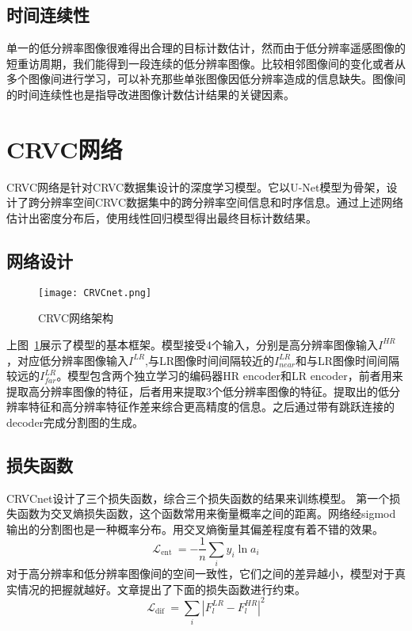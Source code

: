 \subsection{时间连续性}
单一的低分辨率图像很难得出合理的目标计数估计，然而由于低分辨率遥感图像的短重访周期，我们能得到一段连续的低分辨率图像。比较相邻图像间的变化或者从多个图像间进行学习，可以补充那些单张图像因低分辨率造成的信息缺失。图像间的时间连续性也是指导改进图像计数估计结果的关键因素。
\section{CRVC网络}
CRVC网络是针对CRVC数据集设计的深度学习模型。它以U-Net模型为骨架，设计了跨分辨率空间CRVC数据集中的跨分辨率空间信息和时序信息。通过上述网络估计出密度分布后，使用线性回归模型得出最终目标计数结果。
\subsection{网络设计}
\begin{figure}[h]
    \centering
    \texttt{[image: CRVCnet.png]}
    \caption{CRVC网络架构}
    \label{fig:CRVCnet}
\end{figure}

上图~\ref{fig:CRVCnet}展示了模型的基本框架。模型接受4个输入，分别是高分辨率图像输入$I^{HR}$，对应低分辨率图像输入$I^{LR}$,与LR图像时间间隔较近的$I^{LR}_{near}$和与LR图像时间间隔较远的$I^{LR}_{far}$。模型包含两个独立学习的编码器HR encoder和LR encoder，前者用来提取高分辨率图像的特征，后者用来提取3个低分辨率图像的特征。提取出的低分辨率特征和高分辨率特征作差来综合更高精度的信息。之后通过带有跳跃连接的decoder完成分割图的生成。
\subsection{损失函数}
CRVCnet设计了三个损失函数，综合三个损失函数的结果来训练模型。
第一个损失函数为交叉熵损失函数，这个函数常用来衡量概率之间的距离。网络经sigmod输出的分割图也是一种概率分布。用交叉熵衡量其偏差程度有着不错的效果。
\begin{equation}
    \mathcal{L}_{\text {ent }}=-\frac{1}{n} \sum_{i} y_{i} \ln a_{i}
\end{equation}
对于高分辨率和低分辨率图像间的空间一致性，它们之间的差异越小，模型对于真实情况的把握就越好。文章提出了下面的损失函数进行约束。
\begin{equation}
    \mathcal{L}_{\text {dif }}=\sum_{i}\left|F_l^{L R}-F^{HR}_{l}\right|^2
\end{equation}

